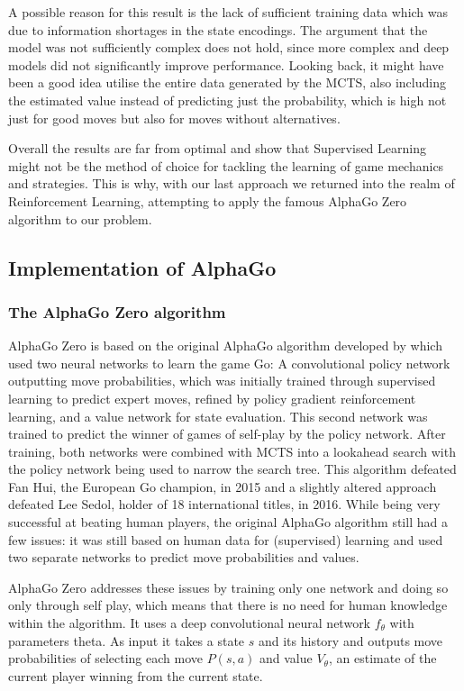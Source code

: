 \documentclass[12pt,a4paper]{article}
\begin{document}
A possible reason for this result is the lack of sufficient training data which was due to information shortages in the state encodings. The argument that the model was not sufficiently complex does not hold, since more complex and deep models did not significantly improve performance. Looking back, it might have been a good idea utilise the entire data generated by the MCTS, also including the estimated value instead of predicting just the probability, which is high not just for good moves but also for moves without alternatives.

Overall the results are far from optimal and show that Supervised Learning might not be the method of choice for tackling the learning of game mechanics and strategies. This is why, with our last approach we returned into the realm of Reinforcement Learning, attempting to apply the famous AlphaGo Zero algorithm to our problem.

\subsection{Implementation of AlphaGo}
\subsubsection{The AlphaGo Zero algorithm}
AlphaGo Zero is based on the original AlphaGo algorithm developed by \citet{silver_mastering_2017} which used two neural networks to learn the game Go: A convolutional policy network outputting move probabilities, which was initially trained through supervised learning to predict expert moves, refined by policy gradient reinforcement learning, and a value network for state evaluation. This second network was trained to predict the winner of games of self-play by the policy network. After training, both networks were combined with MCTS into a lookahead search with the policy network being used to narrow the search tree. This algorithm defeated Fan Hui, the European Go champion, in 2015 and a slightly altered approach defeated Lee Sedol, holder of 18 international titles, in 2016. While being very successful at beating human players, the original AlphaGo algorithm still had a few issues: it was still based on human data for (supervised) learning and used two separate networks to predict move probabilities and values. 

AlphaGo Zero addresses these issues by training only one network and doing so only through self play, which means that there is no need for human knowledge within the algorithm. It uses a deep convolutional neural network $f_\theta$ with parameters theta. As input it takes a state $s$ and its history and outputs move probabilities of selecting each move $P(s,a)$ and value $V_\theta$, an estimate of the current player winning from the current state. 
\end{document}
